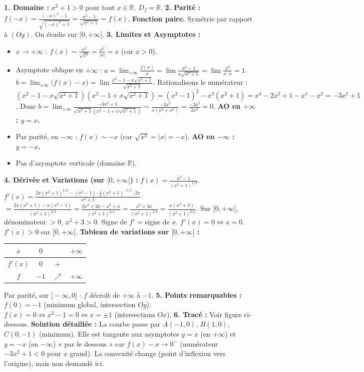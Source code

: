 \documentclass[11pt]{article}
\begin{document}
\begin{exoresolu}[Étude et tracé de $f(x) = \dfrac{x^2 - 1}{\sqrt{x^2 + 1}}$ sur $\mathbb{R}$]
\textbf{1. Domaine :} $x^2+1 > 0$ pour tout $x \in \mathbb{R}$. $D_f = \mathbb{R}$.
\textbf{2. Parité :} $f(-x) = \frac{(-x)^2-1}{\sqrt{(-x)^2+1}} = \frac{x^2-1}{\sqrt{x^2+1}} = f(x)$. \textbf{Fonction paire.} Symétrie par rapport à $(Oy)$. On étudie sur $[0, +\infty[$.
\textbf{3. Limites et Asymptotes :}
\begin{itemize}
    \item $x \to +\infty$ : $f(x) \sim \frac{x^2}{\sqrt{x^2}} = \frac{x^2}{|x|} = x$ (car $x>0$).
    \item Asymptote oblique en $+\infty$ :
    $a = \lim_{+\infty} \frac{f(x)}{x} = \lim \frac{x^2-1}{x\sqrt{x^2+1}} = \lim \frac{x^2}{x\cdot x} = 1$.
    $b = \lim_{+\infty} \bigl( f(x) - x \bigr) = \lim \frac{x^2-1 - x\sqrt{x^2+1}}{\sqrt{x^2+1}}$.
    Rationalisons le numérateur :
    $(x^2-1 - x\sqrt{x^2+1})(x^2-1 + x\sqrt{x^2+1}) = (x^2-1)^2 - x^2(x^2+1) = x^4 -2x^2+1 - x^4 - x^2 = -3x^2+1$.
    Donc $b = \lim_{+\infty} \frac{-3x^2+1}{\sqrt{x^2+1}(x^2-1 + x\sqrt{x^2+1})} \sim \frac{-3x^2}{x(x^2+x^2)} = \frac{-3x^2}{2x^3} = 0$.
    \textbf{AO en $+\infty$ : $y = x$.}
    \item Par parité, en $-\infty$ : $f(x) \sim -x$ (car $\sqrt{x^2}=|x|=-x$). \textbf{AO en $-\infty$ : $y = -x$.}
    \item Pas d'asymptote verticale (domaine $\mathbb{R}$).
\end{itemize}
\textbf{4. Dérivée et Variations (sur $[0,+\infty[$) :}
$f(x) = \frac{x^2-1}{(x^2+1)^{1/2}}$.
$f'(x) = \frac{2x(x^2+1)^{1/2} - (x^2-1)\cdot\frac{1}{2}(x^2+1)^{-1/2}\cdot 2x}{x^2+1}$
$= \frac{2x(x^2+1) - x(x^2-1)}{(x^2+1)^{3/2}} = \frac{2x^3+2x - x^3+x}{(x^2+1)^{3/2}} = \frac{x^3+3x}{(x^2+1)^{3/2}} = \frac{x(x^2+3)}{(x^2+1)^{3/2}}$.
Sur $[0,+\infty[$, dénominateur $>0$, $x^2+3>0$. Signe de $f'$ = signe de $x$.
$f'(x) = 0 \iff x=0$. $f'(x) > 0$ sur $]0,+\infty[$.
\textbf{Tableau de variations sur $[0,+\infty[$ :}
\begin{center}
\begin{tabular}{|c|ccc|}\hline
$x$ & $0$ & & $+\infty$ \\ \hline
$f'(x)$ & $0$ & $+$ & \\ \hline
$f$ & $-1$ & $\nearrow$ & $+\infty$ \\ \hline
\end{tabular}
\end{center}
Par parité, sur $]-\infty,0]$ : $f$ décroît de $+\infty$ à $-1$.
\textbf{5. Points remarquables :}
$f(0) = -1$ (minimum global, intersection $Oy$).
$f(x)=0 \iff x^2-1=0 \iff x=\pm 1$ (intersections $Ox$).
\textbf{6. Tracé :} Voir figure ci-dessous.
\tcblower
\textbf{Solution détaillée :} La courbe passe par $A(-1,0)$, $B(1,0)$, $C(0,-1)$ (minimum). Elle est tangente aux asymptotes $y=x$ (en $+\infty$) et $y=-x$ (en $-\infty$) « par le dessous » car $f(x) - x \to 0^-$ (numérateur $-3x^2+1 < 0$ pour $x$ grand). La convexité change (point d'inflexion vers l'origine), mais non demandé ici.
\end{exoresolu}
\end{document}
